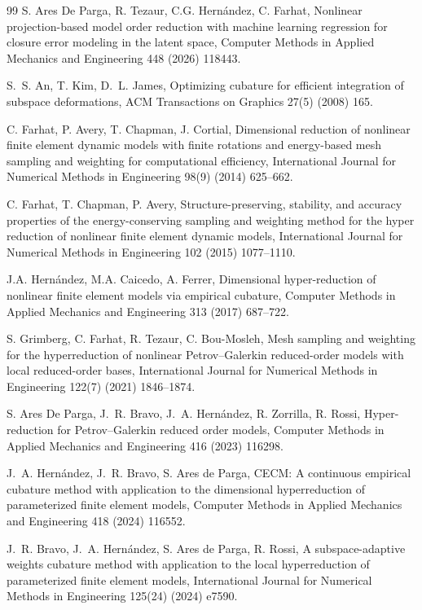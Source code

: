\begin{thebibliography}{99}
S. Ares De Parga, R. Tezaur, C.G. Hern\'andez, C. Farhat,
Nonlinear projection-based model order reduction with machine learning regression for closure error modeling in the latent space,
Computer Methods in Applied Mechanics and Engineering 448 (2026) 118443.

S.~S. An, T. Kim, D.~L. James, Optimizing cubature for efficient
integration of subspace deformations, ACM Transactions on
Graphics 27(5) (2008) 165.

C. Farhat, P. Avery, T. Chapman, J. Cortial, Dimensional reduction
of nonlinear finite element dynamic models with finite rotations and
energy-based mesh sampling and weighting for computational efficiency,
International Journal for Numerical Methods in Engineering
98(9) (2014) 625--662.

C. Farhat, T. Chapman, P. Avery, Structure-preserving, stability, and accuracy properties of the energy-conserving sampling and weighting method for the hyper reduction of nonlinear finite element dynamic models, International Journal for Numerical Methods in Engineering 102 (2015) 1077--1110. 

J.A. Hern\'andez, M.A. Caicedo, A. Ferrer, Dimensional hyper-reduction of nonlinear finite element models via empirical cubature, Computer Methods in Applied Mechanics and Engineering 313 (2017) 687--722. 

S. Grimberg, C. Farhat, R. Tezaur, C. Bou-Mosleh, Mesh sampling and
weighting for the hyperreduction of nonlinear Petrov--Galerkin
reduced-order models with local reduced-order bases, International
Journal for Numerical Methods in Engineering 122(7) (2021) 1846--1874.

S. Ares De Parga, J.~R. Bravo, J.~A. Hern\'andez, R. Zorrilla,
R. Rossi, Hyper-reduction for Petrov--Galerkin reduced order models,
Computer Methods in Applied Mechanics and Engineering
416 (2023) 116298.

J.~A. Hern\'andez, J.~R. Bravo, S. Ares de Parga, CECM: A
continuous empirical cubature method with application to the
dimensional hyperreduction of parameterized finite element models,
Computer Methods in Applied Mechanics and Engineering
418 (2024) 116552.

J.~R. Bravo, J.~A. Hern\'andez, S. Ares de Parga, R. Rossi, A
subspace-adaptive weights cubature method with application to the
local hyperreduction of parameterized finite element models,
International Journal for Numerical Methods in Engineering
125(24) (2024) e7590.


\end{thebibliography}
